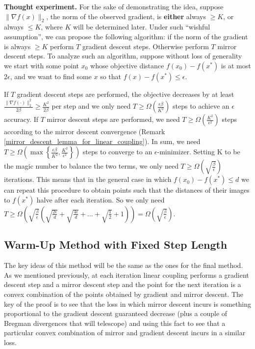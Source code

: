 \textbf{Thought experiment.} For the sake of demonstrating the idea, suppose $\| \nabla f(x) \|_2$, the norm of the observed gradient, is \textbf{either} always $\geq K$, or always $\leq K$, where $K$ will be determined later. Under such ``wishful assumption'', we can propose the following algorithm: if the norm of the gradient is always $\geq K$ perform $T$ gradient descent steps. Otherwise perform $T$ mirror descent steps. To analyze such an algorithm, suppose without loss of generality we start with some point $x_0$ whose objective distance $f(x_0 )-f(x^\ast )$ is at most $2\epsilon$, and we want to find some $x$ so that $f(x) - f(x^\ast) \leq \epsilon$.

If $T$ gradient descent steps are performed, the objective decreases by at least $\frac{\|\nabla f(\cdot)\|_2^2}{2\beta} \geq \frac{K^2}{2\beta}$ per step and we only need $T \geq \Omega\left(\frac{\epsilon \beta}{K^2}\right)$ steps to achieve an $\epsilon$ accuracy. If $T$ mirror descent steps are performed, we need $T \geq \Omega\left(\frac{K^2}{\epsilon^2}\right)$ steps according to the mirror descent convergence (Remark \ref{mirror_descent_lemma_for_linear_coupling}). In sum, we need $T \geq \Omega\left( \max \left\{ \frac{\epsilon \beta}{K^2}, \frac{K^2}{\epsilon^2}\right\}\right)$ steps to converge to an $\epsilon$-minimizer. Setting K to be the magic number to balance the two terms, we only need $T \geq \Omega\left( \sqrt{\frac{\beta}{\epsilon}}\right)$ iterations. This means that in the general case in which $f(x_0) - f(x^\ast) \leq d $ we can repeat this procedure to obtain points such that the distances of their images to $f(x^\ast)$ halve after each iteration. So we only need $T \geq \Omega \left(\sqrt{\frac{\beta}{\epsilon}}\left(\sqrt{\frac{2\epsilon}{d}} + \sqrt{\frac{4\epsilon}{d}} + \dots + \sqrt{\frac{1}{2} }+ 1 \right)\right) = \Omega \left( \sqrt{\frac{\beta}{\epsilon}}\right)$.

\subsection{Warm-Up Method with Fixed Step Length}
The key ideas of this method will be the same as the ones for the final method. As we mentioned previously, at each iteration linear coupling performs a gradient descent step and a mirror descent step and the point for the next iteration is a convex combination of the points obtained by gradient and mirror descent. The key of the proof is to see that the loss in which mirror descent incurs is something proportional to the gradient descent guaranteed decrease (plus a couple of Bregman divergences that will telescope) and using this fact to see that a particular convex combination of mirror and gradient descent incurs in a similar loss.

